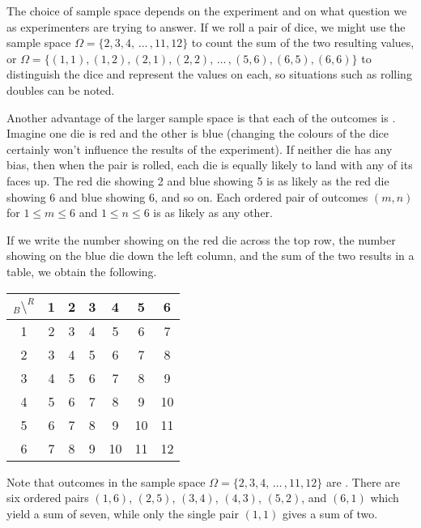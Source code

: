 \par
The choice of sample space depends on the experiment and on what question we as experimenters are trying to answer. If we roll a pair of dice, we might use the sample space $\Omega = \{2,3,4,\,\dots\,,11,12\}$ to count the sum of the two resulting values, or $\Omega = \{(1,1),(1,2),(2,1),(2,2),\,\dots\,,(5,6),(6,5),(6,6)\}$ to distinguish the dice and represent the values on each, so situations such as rolling doubles can be noted.
\par
Another advantage of the larger sample space is that each of the outcomes is . Imagine one die is red and the other is blue (changing the colours of the dice certainly won't influence the results of the experiment). If neither die has any bias, then when the pair is rolled, each die is equally likely to land with any of its faces up. The red die showing 2 and blue showing 5 is as likely as the red die showing 6 and blue showing 6, and so on. Each ordered pair of outcomes $(m,n)$ for $1 \leq m \leq 6$ and $1 \leq n \leq 6$ is as likely as any other.
\par
If we write the number showing on the red die across the top row, the number showing on the blue die down the left column, and the sum of the two results in a table, we obtain the following.
{\small
\begin{center}
\begin{tabular}{c|cccccc}
$_{B} \setminus ^R$ & 1 & 2 & 3 & 4 & 5 & 6 \\
\hline
1 & 2 & 3 & 4 & 5 & 6 & 7 \\
2 & 3 & 4 & 5 & 6 & 7 & 8 \\
3 & 4 & 5 & 6 & 7 & 8 & 9 \\
4 & 5 & 6 & 7 & 8 & 9 & $\!$10 \\
5 & 6 & 7 & 8 & 9 & $\!$10 & $\!$11 \\
6 & 7 & 8 & 9 & $\!$10 & $\!$11 & $\!$12 \\
\end{tabular}
\end{center}
}
Note that outcomes in the sample space $\Omega = \{2,3,4,\,\dots\,,11,12\}$ are . There are six ordered pairs $(1,6)$, $(2,5)$, $(3,4)$, $(4,3)$, $(5,2)$, and $(6,1)$ which yield a sum of seven, while only the single pair $(1,1)$ gives a sum of two.
